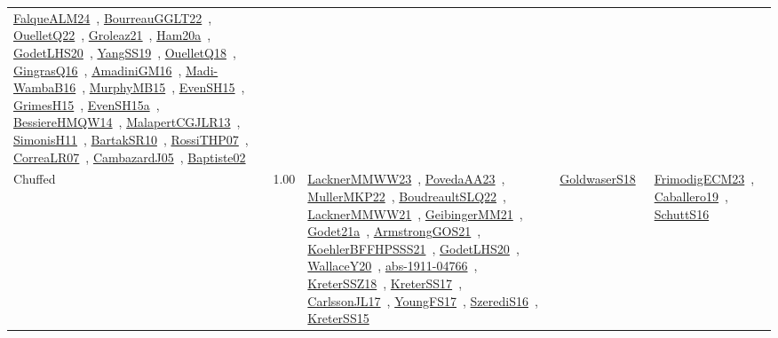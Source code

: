 {\begin{longtable}{p{3cm}r>{\raggedright\arraybackslash}p{6cm}>{\raggedright\arraybackslash}p{6cm}>{\raggedright\arraybackslash}p{8cm}}
\href{../works/FalqueALM24.pdf}{FalqueALM24}~\cite{FalqueALM24}, \href{../works/BourreauGGLT22.pdf}{BourreauGGLT22}~\cite{BourreauGGLT22}, \href{../works/OuelletQ22.pdf}{OuelletQ22}~\cite{OuelletQ22}, \href{../works/Groleaz21.pdf}{Groleaz21}~\cite{Groleaz21}, \href{../works/Ham20a.pdf}{Ham20a}~\cite{Ham20a}, \href{../works/GodetLHS20.pdf}{GodetLHS20}~\cite{GodetLHS20}, \href{../works/YangSS19.pdf}{YangSS19}~\cite{YangSS19}, \href{../works/OuelletQ18.pdf}{OuelletQ18}~\cite{OuelletQ18}, \href{../works/GingrasQ16.pdf}{GingrasQ16}~\cite{GingrasQ16}, \href{../works/AmadiniGM16.pdf}{AmadiniGM16}~\cite{AmadiniGM16}, \href{../works/Madi-WambaB16.pdf}{Madi-WambaB16}~\cite{Madi-WambaB16}, \href{../works/MurphyMB15.pdf}{MurphyMB15}~\cite{MurphyMB15}, \href{../works/EvenSH15.pdf}{EvenSH15}~\cite{EvenSH15}, \href{../works/GrimesH15.pdf}{GrimesH15}~\cite{GrimesH15}, \href{../works/EvenSH15a.pdf}{EvenSH15a}~\cite{EvenSH15a}, \href{../works/BessiereHMQW14.pdf}{BessiereHMQW14}~\cite{BessiereHMQW14}, \href{../works/MalapertCGJLR13.pdf}{MalapertCGJLR13}~\cite{MalapertCGJLR13}, \href{../works/SimonisH11.pdf}{SimonisH11}~\cite{SimonisH11}, \href{../works/BartakSR10.pdf}{BartakSR10}~\cite{BartakSR10}, \href{../works/RossiTHP07.pdf}{RossiTHP07}~\cite{RossiTHP07}, \href{../works/CorreaLR07.pdf}{CorreaLR07}~\cite{CorreaLR07}, \href{../works/CambazardJ05.pdf}{CambazardJ05}~\cite{CambazardJ05}, \href{../works/Baptiste02.pdf}{Baptiste02}~\cite{Baptiste02}\\
\index{Chuffed}\index{CPSystems!Chuffed}Chuffed &  1.00 & \href{../works/LacknerMMWW23.pdf}{LacknerMMWW23}~\cite{LacknerMMWW23}, \href{../works/PovedaAA23.pdf}{PovedaAA23}~\cite{PovedaAA23}, \href{../works/MullerMKP22.pdf}{MullerMKP22}~\cite{MullerMKP22}, \href{../works/BoudreaultSLQ22.pdf}{BoudreaultSLQ22}~\cite{BoudreaultSLQ22}, \href{../works/LacknerMMWW21.pdf}{LacknerMMWW21}~\cite{LacknerMMWW21}, \href{../works/GeibingerMM21.pdf}{GeibingerMM21}~\cite{GeibingerMM21}, \href{../works/Godet21a.pdf}{Godet21a}~\cite{Godet21a}, \href{../works/ArmstrongGOS21.pdf}{ArmstrongGOS21}~\cite{ArmstrongGOS21}, \href{../works/KoehlerBFFHPSSS21.pdf}{KoehlerBFFHPSSS21}~\cite{KoehlerBFFHPSSS21}, \href{../works/GodetLHS20.pdf}{GodetLHS20}~\cite{GodetLHS20}, \href{../works/WallaceY20.pdf}{WallaceY20}~\cite{WallaceY20}, \href{../works/abs-1911-04766.pdf}{abs-1911-04766}~\cite{abs-1911-04766}, \href{../works/KreterSSZ18.pdf}{KreterSSZ18}~\cite{KreterSSZ18}, \href{../works/KreterSS17.pdf}{KreterSS17}~\cite{KreterSS17}, \href{../works/CarlssonJL17.pdf}{CarlssonJL17}~\cite{CarlssonJL17}, \href{../works/YoungFS17.pdf}{YoungFS17}~\cite{YoungFS17}, \href{../works/SzerediS16.pdf}{SzerediS16}~\cite{SzerediS16}, \href{../works/KreterSS15.pdf}{KreterSS15}~\cite{KreterSS15} & \href{../works/GoldwaserS18.pdf}{GoldwaserS18}~\cite{GoldwaserS18} & \href{../works/FrimodigECM23.pdf}{FrimodigECM23}~\cite{FrimodigECM23}, \href{../works/Caballero19.pdf}{Caballero19}~\cite{Caballero19}, \href{../works/SchuttS16.pdf}{SchuttS16}~\cite{SchuttS16}\\

\end{longtable}}
